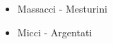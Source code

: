 \documentclass[preview]{standalone}
\begin{document}
\begin{itemize}
\item Massacci - Mesturini
\item Micci - Argentati
\end{itemize}
\end{document}
